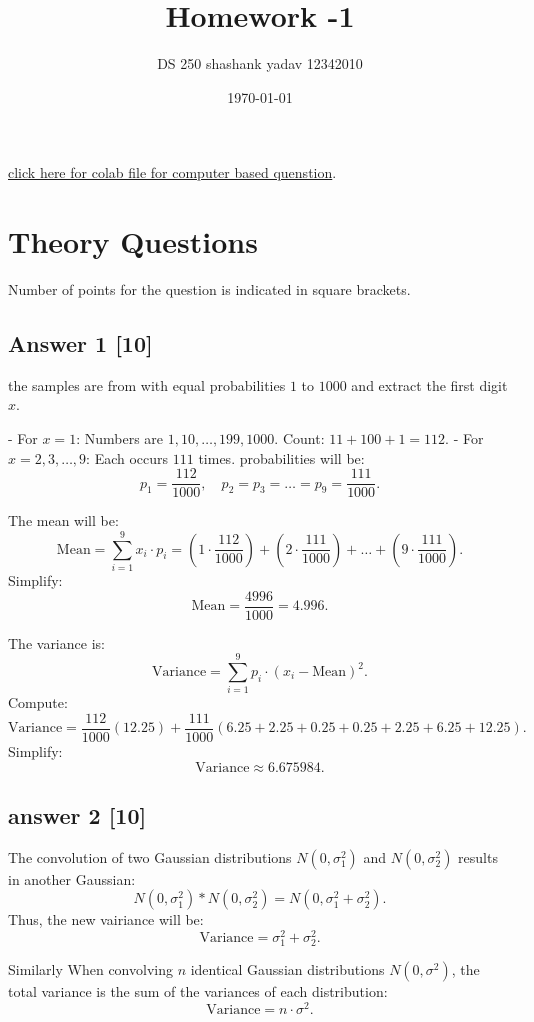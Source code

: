 \documentclass[12pt]{article}
\title{Homework -1 }
\author{DS 250 shashank yadav 12342010}
\date{\today} %
\begin{document}
\maketitle
\thispagestyle{empty} %
\href{https://colab.research.google.com/drive/1HwIdLMlzcBsNvkJgrYGyu2AyvWHZYkG6?usp=sharing}{click here for colab file for computer based quenstion}.
\section{Theory Questions}
Number of points for the question is indicated in square brackets.
\subsection*{Answer 1 [10] }
the samples are from with equal probabilities \( 1 \) to \( 1000 \) and extract the first digit \( x \). 


- For \( x = 1 \): Numbers are \( 1, 10, \dots, 199, 1000 \). Count: \( 11 +100 + 1 = 112 \).
- For \( x = 2, 3, \dots, 9 \): Each occurs \( 111 \) times.
 probabilities will be:
\[
p_1 = \frac{112}{1000}, \quad p_2 = p_3 = \dots = p_9 = \frac{111}{1000}.
\]


The mean will be:
\[
\text{Mean} = \sum_{i=1}^9 x_i \cdot p_i = (1 \cdot \frac{112}{1000}) + (2 \cdot \frac{111}{1000}) + \dots + (9 \cdot \frac{111}{1000}).
\]
Simplify:
\[
\text{Mean}  = \frac{4996}{1000} = 4.996.
\]


The variance is:
\[
\text{Variance} = \sum_{i=1}^9 p_i \cdot (x_i - \text{Mean})^2.
\]
Compute:
\[
\text{Variance} = \frac{112}{1000}(12.25) + \frac{111}{1000}(6.25 + 2.25 + 0.25 + 0.25 + 2.25 + 6.25 + 12.25).
\]
Simplify:
\[
\text{Variance} \approx  6.675984.
\]


\subsection*{answer 2 [10]}

The convolution of two Gaussian distributions \( N(0, \sigma_1^2) \) and \( N(0, \sigma_2^2) \) results in another Gaussian:
\[
N(0, \sigma_1^2) * N(0, \sigma_2^2) = N(0, \sigma_1^2 + \sigma_2^2).
\]
Thus, the new vairiance will be:
\[
\text{Variance} = \sigma_1^2 + \sigma_2^2.
\]


Similarly When convolving \( n \) identical Gaussian distributions \( N(0, \sigma^2) \), the total variance is the sum of the variances of each distribution:
\[
\text{Variance} = n \cdot \sigma^2.
\]
\end{document}
